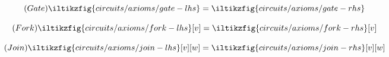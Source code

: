 \begin{figure*}
    \centering
    \begin{minipage}[b]{0.28\textwidth}
        \begin{equation}
            \tag{\(\mathsf{Gate}\)}
            \iltikzfig{circuits/axioms/gate-lhs}
            =
            \iltikzfig{circuits/axioms/gate-rhs}
            \label{eq:gate}
        \end{equation}
    \end{minipage}%
    \begin{minipage}[b]{0.24\textwidth}
        \begin{equation}\textbf{}
            \tag{\(\mathsf{Fork}\)}
            \iltikzfig{circuits/axioms/fork-lhs}[v]
            =
            \iltikzfig{circuits/axioms/fork-rhs}[v]
            \label{eq:fork}
        \end{equation}
    \end{minipage}%
    \begin{minipage}[b]{0.25\textwidth}
        \begin{equation}
            \tag{\(\mathsf{Join}\)}
            \iltikzfig{circuits/axioms/join-lhs}[v][w]
            =
            \iltikzfig{circuits/axioms/join-rhs}[v][w]
            \label{eq:join}
        \end{equation}
    \end{minipage}


\end{figure*}
